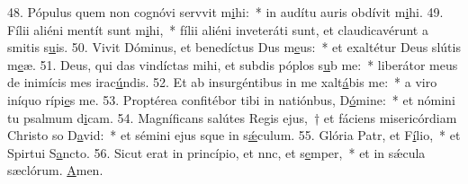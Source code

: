 48. Pópulus quem non cognóvi servvit m\uline{i}hi:~* in audítu auris obdívit m\uline{i}hi.
49. Fílii aliéni mentít sunt m\uline{i}hi,~* fílii aliéni inveteráti sunt, et claudicavérunt a smitis s\uline{u}is.
50. Vivit Dóminus, et benedíctus Dus m\uline{e}us:~* et exaltétur Deus slútis m\uline{e}æ.
51. Deus, qui das vindíctas mihi, et subdis póplos s\uline{u}b me:~* liberátor meus de inimícis mes irac\uline{ú}ndis.
52. Et ab insurgéntibus in me xalt\uline{á}bis me:~* a viro iníquo rípi\uline{e}s me.
53. Proptérea confitébor tibi in natiónbus, D\uline{ó}mine:~* et nómini tu psalmum d\uline{i}cam.
54. Magníficans salútes Regis ejus,~† et fáciens misericórdiam Christo so D\uline{a}vid:~* et sémini ejus sque in s\uline{ǽ}culum.
55. Glória Patr, et F\uline{í}lio,~* et Spirtui S\uline{a}ncto.
56. Sicut erat in princípio, et nnc, et s\uline{e}mper,~* et in sǽcula sæclórum. \uline{A}men.
